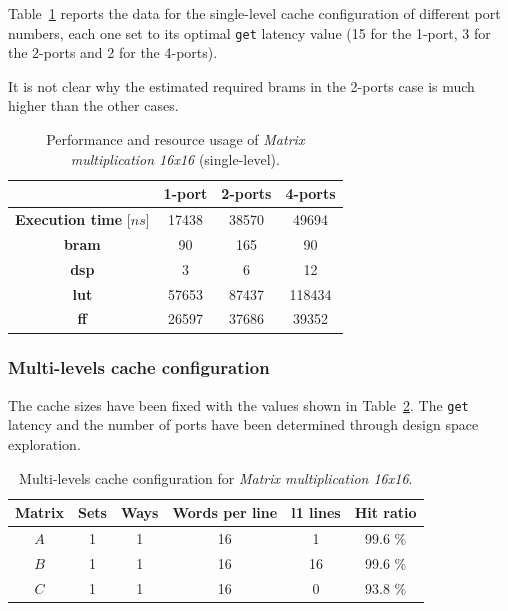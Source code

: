 \documentclass[11pt,a4paper,oneside]{memoir}
\begin{document}
Table~\ref{tab:matmul_16_no_l1_ports_report} reports the data for the
single-level cache configuration of different port numbers, each one set to its
optimal \texttt{get} latency value (15 for the 1-port, 3 for the 2-ports and 2
for the 4-ports).

It is not clear why the estimated required \acp{bram} in the 2-ports case is much
higher than the other cases.

\begin{table}[H]
	\begin{center}
		\begin{tabular}{cccc}
			\hline
			\rowcolor{gray!50}
			& \textbf{1-port} & \textbf{2-ports} & \textbf{4-ports} \\
			\hline
			\textbf{Execution time} [$ns$] & 17438 & 38570 & 49694 \\
			\rowcolor{gray!25}
			\textbf{\ac{bram}} & 90 & 165 & 90 \\
			\textbf{\acs{dsp}} & 3 & 6 & 12 \\
			\rowcolor{gray!25}
			\textbf{\acs{lut}} & 57653 & 87437 & 118434 \\
			\textbf{\acs{ff}} & 26597 & 37686 & 39352 \\
			\hline
		\end{tabular}
	\end{center}
	\caption{Performance and resource usage of \emph{Matrix multiplication
	16x16} (single-level).}
	\label{tab:matmul_16_no_l1_ports_report}
\end{table}

\subsubsection{Multi-levels cache configuration}
The cache sizes have been fixed with the values shown in
Table~\ref{tab:matmul_16_l1_config}.
The \texttt{get} latency and the number of ports have been determined through
design space exploration.

\begin{table}[H]
	\begin{center}
		\begin{tabular}{cccccc}
			\hline
			\rowcolor{gray!50}
			\textbf{Matrix} &
			\textbf{Sets} & \textbf{Ways} & \textbf{Words per line} &
			\textbf{\ac{l1} lines} & \textbf{Hit ratio} \\
			\hline
			$A$ & 1 & 1 & 16 & 1 & 99.6 \% \\
			\rowcolor{gray!25}
			$B$ & 1 & 1 & 16 & 16 & 99.6 \% \\
			$C$ & 1 & 1 & 16 & 0 & 93.8 \% \\
			\hline
		\end{tabular}
	\end{center}
	\caption{Multi-levels cache configuration for \emph{Matrix
	multiplication 16x16}.}
	\label{tab:matmul_16_l1_config}
\end{table}
\end{document}
